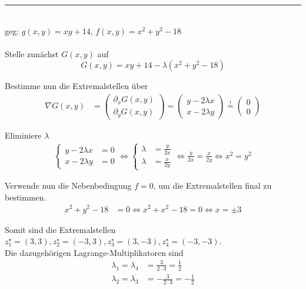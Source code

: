 \documentclass{article}
\begin{document}
\newpage


{\color{blue}
\hrule
	\\
	geg: $g(x,y) = xy + 14$, $f(x,y) = x^2 + y^2 - 18$\\
	\\
	Stelle zunächst $G(x,y)$ auf
		$$G(x,y) = xy + 14 - \lambda(x^2 + y^2 - 18)$$
	
	Bestimme nun die Extremalstellen über 
		\begin{align*}
			\nabla G(x,y) &=
			\begin{pmatrix}
				\partial_x G(x,y)\\
				\partial_y G(x,y)
			\end{pmatrix}
			=
			\begin{pmatrix}
				y - 2\lambda x\\
				x - 2\lambda y
			\end{pmatrix}
			\stackrel{!}{=}
			\begin{pmatrix}
				0\\
				0
			\end{pmatrix}
		\end{align*}
	
	Eliminiere $\lambda$
		\begin{align*}
			\begin{cases}
				y - 2\lambda x &= 0\\
				x - 2\lambda y &= 0
			\end{cases}
			\Leftrightarrow
			\begin{cases}
				\lambda &= \frac{y}{2x}\\
				\lambda &= \frac{x}{2y}
			\end{cases}
			\Leftrightarrow
			\frac{y}{2x} = \frac{x}{2y}
			\Leftrightarrow
			x^2 = y^2
		\end{align*}
	
	Verwende nun die Nebenbedingung $f=0$, um die Extremalstellen final zu bestimmen.
		\begin{align*}
			x^2 + y^2 - 18 &= 0 \Leftrightarrow x^2 + x^2 -18 = 0 \Leftrightarrow x = \pm 3
		\end{align*}
	
	Somit sind die Extremalstellen $z_1^\star = (3,3), z_2^\star = (-3,3), z_3^\star = (3,-3), z_4^\star = (-3,-3)$.\\
	Die dazugehörigen Lagrange-Multiplikatoren sind
		\begin{align*}
			\lambda_1 = \lambda_4 &= \frac{3}{2\cdot 3} = \frac{1}{2}\\
			\lambda_2 = \lambda_3 &= -\frac{3}{2\cdot 3} = -\frac{1}{2}
		\end{align*}

}
\end{document}
